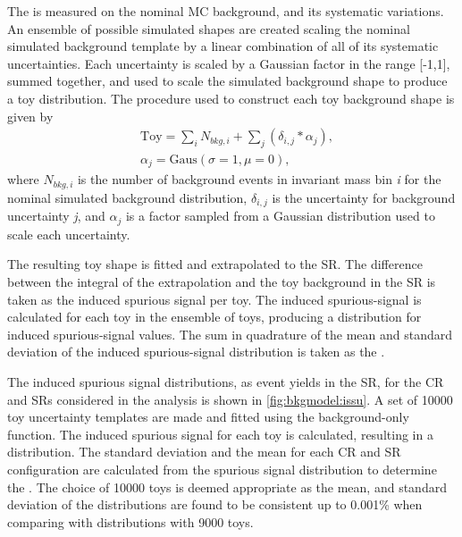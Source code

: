 The \ISSU is measured on the nominal MC background, and its systematic variations. An ensemble of possible simulated shapes are created scaling the nominal simulated background template by a linear combination of all of its systematic uncertainties. Each uncertainty is scaled by a Gaussian factor in the range [-1,1], summed together, and used to scale the simulated background shape to produce a toy distribution. The procedure used to construct each toy background shape is given by
\begin{equation}
    \label{eq:issutoy}
    \begin{aligned}
        & \mathrm{Toy} = \sum_{i} N_{bkg,i} + \sum_{j} \left(\delta_{i,j} * \alpha_{j}\right), \\
        & \alpha_j = \mathrm{Gaus}(\sigma=1,\mu=0),
    \end{aligned}
\end{equation}
where $N_{bkg,i}$ is the number of background events in invariant mass bin \emph{i} for the nominal simulated background distribution, $\delta_{i,j}$ is the uncertainty for background uncertainty \emph{j}, and $\alpha_j$ is a factor sampled from a Gaussian distribution used to scale each uncertainty.

The resulting toy shape is fitted and extrapolated to the SR. The difference between the integral of the extrapolation and the toy background in the SR is taken as the induced spurious signal per toy. The induced spurious-signal is calculated for each toy in the ensemble of toys, producing a distribution for induced spurious-signal values. The sum in quadrature of the mean and standard deviation of the induced spurious-signal distribution is taken as the \ISSU. 

The induced spurious signal distributions, as event yields in the SR, for the CR and SRs considered in the analysis is shown in \cref{fig:bkgmodel:issu}. A set of 10000 toy uncertainty templates are made and fitted using the background-only function. The induced spurious signal for each toy is calculated, resulting in a distribution. The standard deviation and the mean for each CR and SR configuration are calculated from the spurious signal distribution to determine the \ISSU. The choice of 10000 toys is deemed appropriate as the mean, and standard deviation of the distributions are found to be consistent up to 0.001\% when comparing with distributions with 9000 toys.


